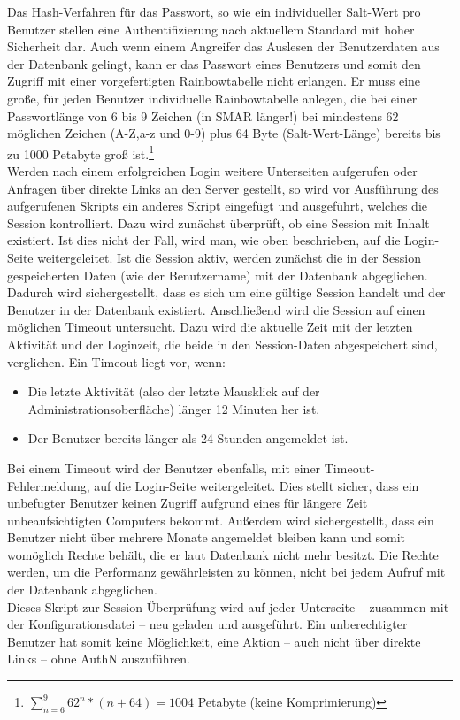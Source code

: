 Das Hash-Verfahren für das Passwort, so wie ein individueller Salt-Wert pro Benutzer stellen eine Authentifizierung nach aktuellem Standard mit hoher Sicherheit dar. Auch wenn einem Angreifer das Auslesen der Benutzerdaten aus der Datenbank gelingt, kann er das Passwort eines Benutzers und somit den Zugriff mit einer vorgefertigten Rainbowtabelle nicht erlangen. Er muss eine große, für jeden Benutzer individuelle Rainbowtabelle anlegen, die bei einer Passwortlänge von 6 bis 9 Zeichen (in \acs{SMAR} länger!) bei mindestens 62 möglichen Zeichen (A-Z,a-z und 0-9) plus 64 Byte (Salt-Wert-Länge) bereits bis zu 1000 Petabyte groß ist.\footnote{$\sum_{n=6}^{9} 62^{n}*(n+64)=1004$ Petabyte (keine Komprimierung)}\\

Werden nach einem erfolgreichen Login weitere Unterseiten aufgerufen oder Anfragen über direkte Links an den Server gestellt, so wird vor Ausführung des aufgerufenen Skripts ein anderes Skript eingefügt und ausgeführt, welches die Session kontrolliert. Dazu wird zunächst überprüft, ob eine Session mit Inhalt existiert. Ist dies nicht der Fall, wird man, wie oben beschrieben, auf die Login-Seite weitergeleitet. Ist die Session aktiv, werden zunächst die in der Session gespeicherten Daten (wie \zB der Benutzername) mit der Datenbank abgeglichen. Dadurch wird sichergestellt, dass es sich um eine gültige Session handelt und der Benutzer in der Datenbank existiert. Anschließend wird die Session auf einen möglichen Timeout untersucht. Dazu wird die aktuelle Zeit mit der letzten Aktivität und der Loginzeit, die beide in den Session-Daten abgespeichert sind, verglichen. Ein Timeout liegt vor, wenn:
\begin{itemize}
	\item Die letzte Aktivität (also der letzte Mausklick auf der Administrationsoberfläche) länger 12 Minuten her ist.
	\item Der Benutzer bereits länger als 24 Stunden angemeldet ist.
\end{itemize}
Bei einem Timeout wird der Benutzer ebenfalls, mit einer Timeout-Fehlermeldung, auf die Login-Seite weitergeleitet. Dies stellt sicher, dass ein unbefugter Benutzer keinen Zugriff aufgrund eines für längere Zeit unbeaufsichtigten Computers bekommt. Außerdem wird sichergestellt, dass ein Benutzer nicht über mehrere Monate angemeldet bleiben kann und somit womöglich Rechte behält, die er laut Datenbank nicht mehr besitzt. Die Rechte werden, um die Performanz gewährleisten zu können, nicht bei jedem Aufruf mit der Datenbank abgeglichen.\\
Dieses Skript zur Session-Überprüfung wird auf jeder Unterseite -- zusammen mit der Konfigurationsdatei -- neu geladen und ausgeführt. Ein unberechtigter Benutzer hat somit keine Möglichkeit, eine Aktion -- auch nicht über direkte Links -- ohne \acl{AuthN} auszuführen.\\

